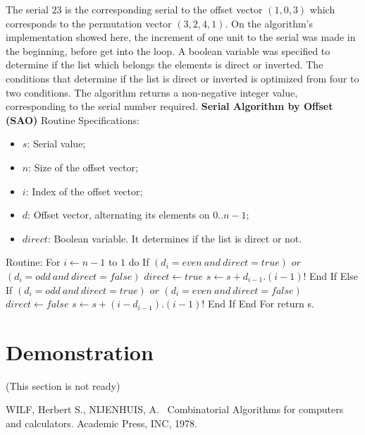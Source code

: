 \documentclass {amsart}
\begin{document}
The serial {$23$} is the corresponding serial to the offset vector
{$(1,0,3)$} which corresponds to the permutation vector
{$(3,2,4,1)$}. On the algorithm's implementation showed here, the
increment of one unit to the serial was made in the beginning,
before get into the loop. A boolean variable was specified to
determine if the list which belongs the elements is direct or
inverted. The conditions that determine if the list is direct or
inverted is optimized from four to two conditions. The algorithm
returns a non-negative integer value, corresponding to the serial
number required.
\newline \newline
\textbf{Serial Algorithm by Offset (SAO)}
\newline
Routine Specifications:
\begin{itemize}
    \item {$s$}: Serial value;
    \item {$n$}: Size of the offset vector;
    \item {$i$}: Index of the offset vector;
    \item {$d$}: Offset vector, alternating its elements on {$0..n-1$};
    \item {$direct$}: Boolean variable. It determines if the list is direct or not.
\end{itemize}
Routine:
\newline
{} \newline
{} \newline \indent
 For {$i \leftarrow n-1$} to {$1$} do \newline \indent \indent
  If {$(d_i= even ~and~ direct = true)$} {$or$} {$(d_i = odd ~and~ direct = false)$} \newline
  \indent \indent \indent
   {$direct \leftarrow true$} \newline \indent
   \indent\indent
   {$s \leftarrow s +  d_{i-1} . (i-1)!$} \newline \indent
   \indent
  End If \newline \indent \indent
  Else \newline \indent \indent
  If {$(d_i = odd ~and~ direct = true)$} {$or$} {$(d_i = even ~and~ direct = false)$}
  \newline \indent \indent \indent
   {$direct \leftarrow false$} \newline \indent \indent \indent
   {$s \leftarrow s +  (i - d_{i-1}) . (i-1)!$} \newline \indent \indent
  End If \newline \indent
 End For \newline
return s.

\section*{Demonstration}
(This section is not ready)


\begin{thebibliography}{99}
 WILF, Herbert S., NIJENHUIS, A.
~Combinatorial Algorithms for computers and calculators. Academic
Press, INC, 1978.
\end{thebibliography}
\end{document}
